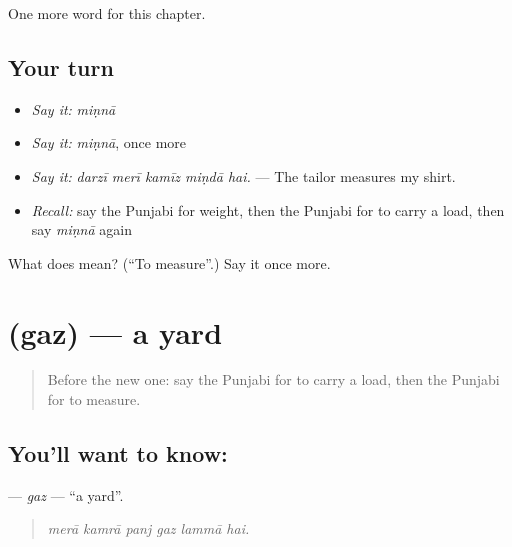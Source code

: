 \begin{grammarlens}[title={What you've built}]
One more word for this chapter.
\end{grammarlens}

\subsection*{Your turn}
\begin{itemize}
\raggedright
  \item \emph{Say it:} \emph{miṇnā}
  \item \emph{Say it:} \emph{miṇnā}, once more
  \item \emph{Say it:} \emph{darzī merī kamīz miṇdā hai.} — The tailor measures my shirt.
  \item \emph{Recall:} say the Punjabi for weight, then the Punjabi for to carry a load, then say \emph{miṇnā} again
\end{itemize}

\begin{tcolorbox}[breakable,colback=teal!4,colframe=teal!35!black,title={Before you move on}]
What does  mean? (\textquotedblleft{}To measure\textquotedblright{}.) Say it once more.
\end{tcolorbox}
\section[\texorpdfstring{\pa{ਗਜ਼} (gaz)}{ਗਜ਼ (gaz)}]{ (gaz) — a yard}

\label{lesson:PA-C274-gaz}



\begin{quote}
Before the new one: say the Punjabi for to carry a load, then the Punjabi for to measure.
\end{quote}

\subsection*{You'll want to know: }
\textbf{} — \emph{gaz} — \textquotedblleft{}a yard\textquotedblright{}.

\begin{quote}
     
\end{quote}

\begin{quote}
\emph{merā kamrā panj gaz lammā hai.}
\end{quote}

